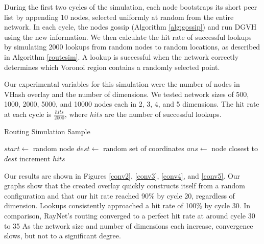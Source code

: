 \documentclass[11pt, conference, letterpaper]{IEEEtran}
\begin{document}
During the first two cycles of the simulation, each node bootstraps its short peer list by appending 10 nodes, selected uniformly at random from the entire network.
In each cycle, the nodes gossip (Algorithm \ref{alg:gossip}) and run DGVH using the new information.
We then calculate the hit rate of successful lookups by simulating 2000 lookups from random nodes to random locations, as described in Algorithm \ref{routesim}.
A lookup is successful when the network correctly determines which Voronoi region contains a randomly selected point.


Our experimental variables for this simulation were the number of nodes in VHash overlay and the number of dimensions.  
We tested network sizes of 500, 1000, 2000, 5000, and 10000 nodes each in 2, 3, 4, and 5 dimensions.
The hit rate at each cycle is $\frac{hits}{2000}$, where $hits$ are the number of successful lookups.




\begin{algorithm}
	\caption{Routing Simulation Sample}
	\label{routesim}
	\begin{algorithmic}[1]  %
		\STATE $start \leftarrow$ random node
		\STATE $dest \leftarrow$ random set of coordinates
		\STATE $ans \leftarrow$ node closest to $dest$
		\STATE increment $hits$
		\ENDIF
	\end{algorithmic} 
\end{algorithm}



Our results are shown in Figures \ref{conv2}, \ref{conv3}, \ref{conv4}, and \ref{conv5}.
Our graphs show that the created overlay quickly constructs itself from a random configuration and that our hit rate reached 90\% by cycle 20, regardless of dimension.
Lookups consistently approached a hit rate of 100\% by cycle 30. 
In comparison, RayNet's routing converged to a perfect hit rate at around cycle 30 to 35 \cite{raynet} 
As the network size and number of dimensions each increase, convergence slows, but not to a significant degree.
\end{document}
